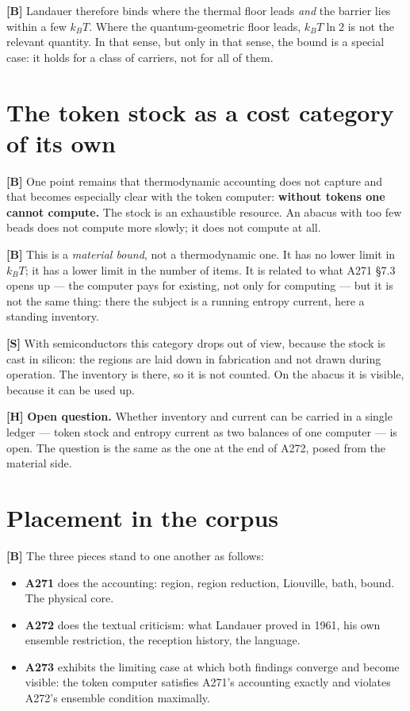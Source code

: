 \textbf{[B]} Landauer therefore binds where the thermal floor leads \emph{and} the barrier
lies within a few $k_BT$. Where the quantum-geometric floor leads, $k_BT\ln 2$ is
not the relevant quantity. In that sense, but only in that sense, the bound is a
special case: it holds for a class of carriers, not for all of them.

\section{The token stock as a cost category of its own}

\textbf{[B]} One point remains that thermodynamic accounting does not capture and that
becomes especially clear with the token computer: \textbf{without tokens one
cannot compute.} The stock is an exhaustible resource. An abacus with too few
beads does not compute more slowly; it does not compute at all.

\textbf{[B]} This is a \emph{material bound}, not a thermodynamic one. It has no lower
limit in $k_BT$; it has a lower limit in the number of items. It is related to
what A271 §7.3 opens up --- the computer pays for existing, not only for computing
--- but it is not the same thing: there the subject is a running entropy current,
here a standing inventory.

\textbf{[S]} With semiconductors this category drops out of view, because the stock is
cast in silicon: the regions are laid down in fabrication and not drawn during
operation. The inventory is there, so it is not counted. On the abacus it is
visible, because it can be used up.

\textbf{[H]} \textbf{Open question.} Whether inventory and current can be carried in a
single ledger --- token stock and entropy current as two balances of one computer
--- is open. The question is the same as the one at the end of A272, posed from
the material side.

\section{Placement in the corpus}

\textbf{[B]} The three pieces stand to one another as follows:

\begin{itemize}[leftmargin=1.4em,itemsep=0.3em]
  \item \textbf{A271} does the accounting: region, region reduction, Liouville,
        bath, bound. The physical core.
  \item \textbf{A272} does the textual criticism: what Landauer proved in 1961,
        his own ensemble restriction, the reception history, the language.
  \item \textbf{A273} exhibits the limiting case at which both findings converge
        and become visible: the token computer satisfies A271's accounting exactly
        and violates A272's ensemble condition maximally.
\end{itemize}

